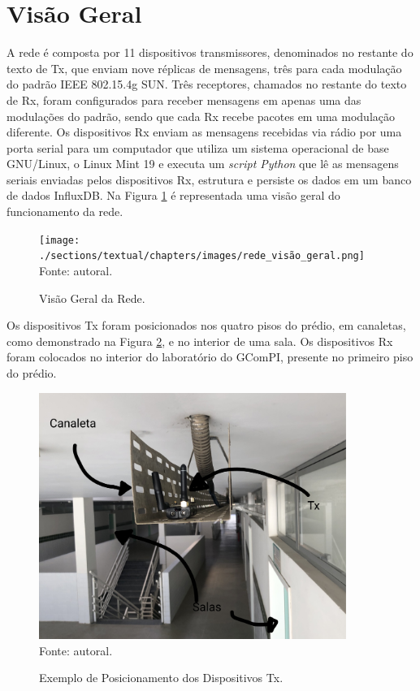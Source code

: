 \section{Visão Geral}
\label{subsec:visaogeral}
A rede é composta por 11 dispositivos transmissores, denominados no restante do texto de Tx, que enviam nove réplicas de mensagens, três para cada modulação do padrão IEEE 802.15.4g SUN. Três receptores, chamados no restante do texto de Rx, foram configurados para receber mensagens em apenas uma das modulações do padrão, sendo que cada Rx recebe pacotes em uma modulação diferente. Os dispositivos Rx enviam as mensagens recebidas via rádio por uma porta serial para um computador que utiliza um sistema operacional de base GNU/Linux, o Linux Mint 19 e executa um \emph{script Python} que lê as mensagens seriais enviadas pelos dispositivos Rx, estrutura e persiste os dados em um banco de dados InfluxDB. Na Figura \ref{fig:rede_visão_geral} é representada uma visão geral do funcionamento da rede.

\begin{figure}[H]
  \begin{center}
    \caption{Visão Geral da Rede.}
    \texttt{[image: ./sections/textual/chapters/images/rede\_visão\_geral.png]}\\
    Fonte: autoral.
    \label{fig:rede_visão_geral}
  \end{center}
\end{figure}

Os dispositivos Tx foram posicionados nos quatro pisos do prédio, em canaletas, como demonstrado na Figura \ref{fig:tx_canaleta}, e no interior de uma sala. Os dispositivos Rx foram colocados no interior do laboratório do GComPI, presente no primeiro piso do prédio.

\begin{figure}[H]
  \begin{center}
    \caption{Exemplo de Posicionamento dos Dispositivos Tx.}
    \includegraphics[width=10cm]{./sections/textual/chapters/images/tx_canaleta.jpg}\\
    Fonte: autoral.
    \label{fig:tx_canaleta}
  \end{center}
\end{figure}

